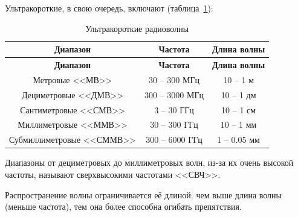 Ультракороткие, в свою очередь, включают (таблица~\ref{tab:ultrarange}):

\begin{longtable}[c]{|c|c|c|}
    \caption{Ультракороткие радиоволны}
    \label{tab:ultrarange}\\
    \hline
    \textbf{Диапазон} & \textbf{Частота} & \textbf{Длина волны}\\
    \hline
    \endfirsthead
    \hline
    \textbf{Диапазон} & \textbf{Частота} & \textbf{Длина волны}\\
    \hline
    \endhead
        Метровые <<МВ>> & 30 -- 300 МГц & 10 -- 1 м\\
        \hline
        Дециметровые <<ДМВ>> & 300 -- 3000 МГц & 10 -- 1 дм\\
        \hline
        Сантиметровые <<СМВ>> & 3 -- 30 ГГц & 10 -- 1 см\\
        \hline
        Миллиметровые <<ММВ>> & 30 -- 300 ГГц & 10 -- 1 мм\\
        \hline
        Субмиллиметровые <<СММВ>> & 300 -- 6000 ГГц & 1 -- 0.05 мм\\
        \hline
\end{longtable}

Диапазоны от дециметровых до миллиметровых волн, из-за их очень высокой частоты, называют сверхвысокими частотами <<СВЧ>>.

Распространение волны ограничивается её длиной: чем выше длина волны (меньше частота), тем она более способна огибать препятствия.
